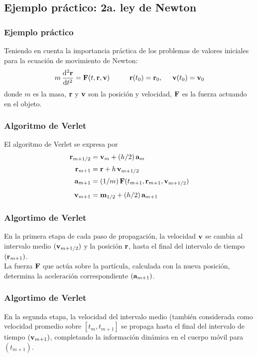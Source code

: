 \subsection*{Ejemplo práctico: 2a. ley de Newton}
\begin{frame}
\frametitle{Ejemplo práctico}
Teniendo en cuenta la importancia práctica de los problemas de valores iniciales para la ecuación de movimiento de Newton:
\begin{align*}
m \, \dv[2]{\vb{r}}{t} =  \vb{F} (t, \vb{r}, \vb{v}) \hspace{1cm} \vb{r}(t_{0}) = \vb{r}_{0}, \hspace{0.5cm} \vb{v}(t_{0}) = \vb{v}_{0}
\end{align*}
donde $m$ es la masa, $\vb{r}$ y $\vb{v}$ son la posición y velocidad, $\vb{F}$ es la fuerza actuando en el objeto.
\end{frame}
\begin{frame}
\frametitle{Algoritmo de Verlet}
El algoritmo de Verlet se expresa por
\begin{align}
\begin{aligned}
\vb{r}_{m+1/2} &= \vb{v}_{m} + (h/2) \, \vb{a}_{m} \\[0.25em]
\vb{r}_{m+1} &= \vb{r} + h \, \vb{v}_{m+1/2} \\[0.25em]
\vb{a}_{m+1} &= (1/m) \, \vb{F}(t_{m+1}, \vb{r}_{m+1}, \vb{v}_{m+1/2}) \\[0.5em]
\vb{v}_{m+1} &= \vb{m}_{1/2} + (h/2) \, \vb{a}_{m+1}
\end{aligned}
\label{eq:ecuacion_12_60}
\end{align}
\end{frame}
\begin{frame}
\frametitle{Algortimo de Verlet}
En la primera etapa de cada paso de propagación, la velocidad $\vb{v}$ se cambia al intervalo medio $(\vb{v}_{m + 1/2})$ y la posición $\vb{r}$, hasta el final del intervalo de tiempo $(\vb{r}_{m + 1})$.
\\
\bigskip
La fuerza $\vb{F}$ que actúa sobre la partícula, calculada con la nueva posición, determina la aceleración correspondiente $(\vb{a}_{m + 1})$.
\end{frame}
\begin{frame}
\frametitle{Algortimo de Verlet}
En la segunda etapa, la velocidad del intervalo medio (también considerada como velocidad promedio sobre $[t_{m}, t_{m + 1}]$ se propaga hasta el final del intervalo de tiempo $(\vb{v}_{m + 1})$, completando la información dinámica en el cuerpo móvil para $(t_{m + 1})$.
\end{frame}
